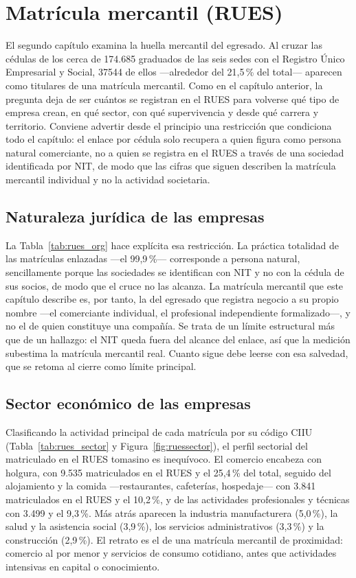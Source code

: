 \section{Matrícula mercantil (RUES)}

El segundo capítulo examina la huella mercantil del egresado. Al cruzar las cédulas de los cerca de 174.685 graduados de las seis sedes con el Registro Único Empresarial y Social, \num{37544} de ellos ---alrededor del 21,5\,\% del total--- aparecen como titulares de una matrícula mercantil. Como en el capítulo anterior, la pregunta deja de ser cuántos se registran en el RUES para volverse qué tipo de empresa crean, en qué sector, con qué supervivencia y desde qué carrera y territorio. Conviene advertir desde el principio una restricción que condiciona todo el capítulo: el enlace por cédula solo recupera a quien figura como persona natural comerciante, no a quien se registra en el RUES a través de una sociedad identificada por NIT, de modo que las cifras que siguen describen la matrícula mercantil individual y no la actividad societaria.

\subsection{Naturaleza jurídica de las empresas}
La Tabla~\ref{tab:rues_org} hace explícita esa restricción. La práctica totalidad de las matrículas enlazadas ---el 99,9\,\%--- corresponde a persona natural, sencillamente porque las sociedades se identifican con NIT y no con la cédula de sus socios, de modo que el cruce no las alcanza. La matrícula mercantil que este capítulo describe es, por tanto, la del egresado que registra negocio a su propio nombre ---el comerciante individual, el profesional independiente formalizado---, y no el de quien constituye una compañía. Se trata de un límite estructural más que de un hallazgo: el NIT queda fuera del alcance del enlace, así que la medición subestima la matrícula mercantil real. Cuanto sigue debe leerse con esa salvedad, que se retoma al cierre como límite principal.



\subsection{Sector económico de las empresas}
Clasificando la actividad principal de cada matrícula por su código CIIU (Tabla~\ref{tab:rues_sector} y Figura~\ref{fig:ruessector}), el perfil sectorial del matriculado en el RUES tomasino es inequívoco. El comercio encabeza con holgura, con 9.535 matriculados en el RUES y el 25,4\,\% del total, seguido del alojamiento y la comida ---restaurantes, cafeterías, hospedaje--- con 3.841 matriculados en el RUES y el 10,2\,\%, y de las actividades profesionales y técnicas con 3.499 y el 9,3\,\%. Más atrás aparecen la industria manufacturera (5,0\,\%), la salud y la asistencia social (3,9\,\%), los servicios administrativos (3,3\,\%) y la construcción (2,9\,\%). El retrato es el de una matrícula mercantil de proximidad: comercio al por menor y servicios de consumo cotidiano, antes que actividades intensivas en capital o conocimiento.


